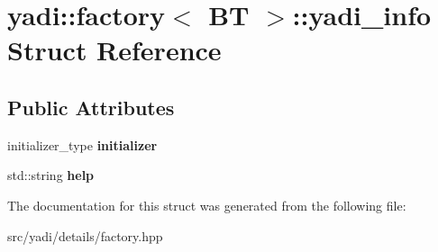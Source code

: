 \hypertarget{structyadi_1_1factory_1_1yadi__info}{}\section{yadi\+:\+:factory$<$ BT $>$\+:\+:yadi\+\_\+info Struct Reference}
\label{structyadi_1_1factory_1_1yadi__info}
\subsection*{Public Attributes}
\begin{DoxyCompactItemize}
\item 
\mbox{\label{structyadi_1_1factory_1_1yadi__info_a63c0e3eb9fd1e8051f5aacee3439c313}} 
initializer\+\_\+type {\bfseries initializer}
\item 
\mbox{\label{structyadi_1_1factory_1_1yadi__info_a5b9a7705a796247d0049755236516015}} 
std\+::string {\bfseries help}
\end{DoxyCompactItemize}


The documentation for this struct was generated from the following file\+:\begin{DoxyCompactItemize}
\item 
src/yadi/details/factory.\+hpp\end{DoxyCompactItemize}
